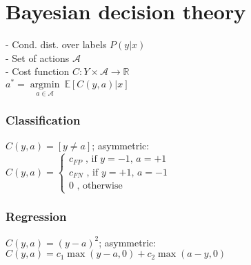 \section*{Bayesian decision theory}
- Cond. dist. over labels $P(y|x)$\\
- Set of actions $\mathcal{A}$\\
- Cost function $C:Y\times \mathcal{A} \rightarrow \mathbb{R}$\\
$a^* = \underset{a \in \mathcal{A}}{\operatorname{argmin}} ~ \mathbb{E}[C(y,a)|x]$\\
\subsubsection*{Classification} $C(y,a) = [y \not = a]$; asymmetric: \\
$C(y,a) =
 \begin{cases}
 	c_{FP} \text{ , if $y=-1$, $a=+1$}\\
		c_{FN} \text{ , if $y=+1$, $a=-1$}\\
		0 \text{ , otherwise}
 \end{cases}$
\subsubsection*{Regression}  $C(y,a) = (y-a)^2$; asymmetric: $C(y,a) = c_1 \max(y-a,0) + c_2 \max(a-y,0)$


